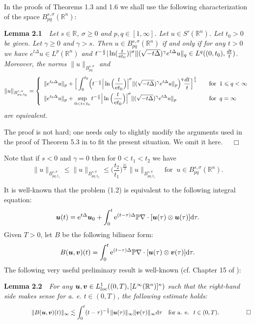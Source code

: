 \documentclass[11pt]{article}
\newcommand{\rmd}{\mbox{\rm d}}
\newcommand{\bfu}{{\mbox{\boldmath $u$}}}
\newcommand{\bfv}{{\mbox{\boldmath $v$}}}
\newcommand{\rme}{{\rm e}}
\begin{document}
  In the proofs of Theorems 1.3 and 1.6 we shall use the following characterization of the space $B^{s,\sigma}_{pq}(\mathbb{R}^n)$:
\medskip

  {\bf Lemma 2.1}\ \ {\em Let $s\in\mathbb{R}$, $\sigma\geqslant 0$ and $p,q\in[1,\infty]$. Let $u\in S'(\mathbb{R}^n)$. Let $t_0>0$ be
  given. Let $\gamma\geqslant 0$ and $\gamma>s$. Then $u\in B^{s,\sigma}_{pq}(\mathbb{R}^n)$ if and only if for any $t>0$ we have $e^{t\Delta}u\in
  L^p(\mathbb{R}^n)$ and $t^{-\frac{s}{2}}|\ln(\frac{t}{\rme t_0})|^{\sigma}\|(\sqrt{-t\Delta})^{\gamma}e^{t\Delta}u\|_q\in L^q((0,t_0),\frac{dt}{t})$.
  Moreover, the norms $\|u\|_{B^{s,\sigma}_{pq}}$ and
$$
  \|u\|_{B^{s,\sigma}_{pq,t_0}}=\left\{
\begin{array}{ll}
  \displaystyle\|e^{t_0\Delta}u\|_p+\Big[\int_0^{t_0}\!\Big(t^{-\frac{s}{2}}\Big|\ln\Big(\frac{t}{\rme t_0}\Big)\Big|^{\sigma}
  \|(\sqrt{-t\Delta})^{\gamma}e^{t\Delta}u\|_p\Big)^q\frac{dt}{t}\Big]^{\frac{1}{q}} \quad &\mbox{for}\;\; 1\leqslant q<\infty\\ [0.3cm]
  \displaystyle\|e^{t_0\Delta}u\|_p+
  \sup_{0<t<t_0}t^{-\frac{s}{2}}\Big|\ln\Big(\frac{t}{\rme t_0}\Big)\Big|^{\sigma}\|(\sqrt{-t\Delta})^{\gamma}e^{t\Delta}u\|_p \quad
  &\mbox{for}\;\; q=\infty
\end{array}
\right.
$$
  are equivalent.}
\medskip

  The proof is not hard; one needs only to slightly modify the arguments used in the proof of Theorem 5.3 in \cite{LEM02} to fit the present
  situation. We omit it here. $\quad\Box$

  Note that if $s<0$ and $\gamma=0$ then for $0<t_1<t_2$ we have
$$
  \|u\|_{B^{s,\sigma}_{pq,t_1}}\leqslant\|u\|_{B^{s,\sigma}_{pq,t_2}}\leqslant
  \Big(\frac{t_2}{t_1}\Big)^{\frac{|s|}{2}}\|u\|_{B^{s,\sigma}_{pq,t_1}} \quad \mbox{for}\;\; u\in B^{s,\sigma}_{pq}(\mathbb{R}^n).
$$

  It is well-known that the problem (1.2) is equivalent to the following integral equation:
$$
  \bfu(t)=\rme^{t\Delta}\bfu_0+\int_0^t\rme^{(t-\tau)\Delta}\mathbb{P}\nabla\cdot[\bfu(\tau)\otimes\bfu(\tau)]\rmd\tau.
$$
  Given $T>0$, let $B$ be the following bilinear form:
$$
  B(\bfu,\bfv)(t)=\int_0^t\rme^{(t-\tau)\Delta}\mathbb{P}\nabla\cdot[\bfu(\tau)\otimes\bfv(\tau)]\rmd\tau.
$$
  The following very useful preliminary result is well-known (cf. Chapter 15 of \cite{LEM02}):
\medskip

  {\bf Lemma 2.2}\ \ {\em For any $\bfu,\bfv\in L^1_{loc}((0,T),[L^{\infty}(\mathbb{R}^n)]^n)$ such that the right-hand side makes sense for
  a. e. $t\in (0,T)$, the following estimate holds:}
$$
  \;\;\qquad\qquad\|B(\bfu,\bfv)(t)\|_{\infty}\lesssim\int_0^t(t-\tau)^{-\frac{1}{2}}\|\bfu(\tau)\|_{\infty}\|\bfv(\tau)\|_{\infty}\rmd\tau \quad
  \mbox{for a. e. }\; t\in (0,T). \qquad\qquad\;\; \Box
$$
\end{document}
